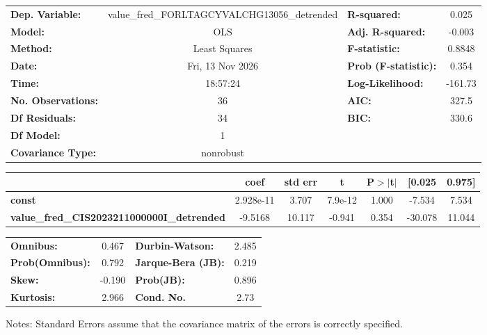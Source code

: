\begin{center}
\begin{tabular}{lclc}
\toprule
\textbf{Dep. Variable:}                            & value\_fred\_FORLTAGCYVALCHG13056\_detrended & \textbf{  R-squared:         } &     0.025   \\
\textbf{Model:}                                    &                     OLS                      & \textbf{  Adj. R-squared:    } &    -0.003   \\
\textbf{Method:}                                   &                Least Squares                 & \textbf{  F-statistic:       } &    0.8848   \\
\textbf{Date:}                                     &               Fri, 13 Nov 2026               & \textbf{  Prob (F-statistic):} &    0.354    \\
\textbf{Time:}                                     &                   18:57:24                   & \textbf{  Log-Likelihood:    } &   -161.73   \\
\textbf{No. Observations:}                         &                        36                    & \textbf{  AIC:               } &     327.5   \\
\textbf{Df Residuals:}                             &                        34                    & \textbf{  BIC:               } &     330.6   \\
\textbf{Df Model:}                                 &                         1                    & \textbf{                     } &             \\
\textbf{Covariance Type:}                          &                  nonrobust                   & \textbf{                     } &             \\
\bottomrule
\end{tabular}
\begin{tabular}{lcccccc}
                                                   & \textbf{coef} & \textbf{std err} & \textbf{t} & \textbf{P$> |$t$|$} & \textbf{[0.025} & \textbf{0.975]}  \\
\midrule
\textbf{const}                                     &    2.928e-11  &        3.707     &   7.9e-12  &         1.000        &       -7.534    &        7.534     \\
\textbf{value\_fred\_CIS2023211000000I\_detrended} &      -9.5168  &       10.117     &    -0.941  &         0.354        &      -30.078    &       11.044     \\
\bottomrule
\end{tabular}
\begin{tabular}{lclc}
\textbf{Omnibus:}       &  0.467 & \textbf{  Durbin-Watson:     } &    2.485  \\
\textbf{Prob(Omnibus):} &  0.792 & \textbf{  Jarque-Bera (JB):  } &    0.219  \\
\textbf{Skew:}          & -0.190 & \textbf{  Prob(JB):          } &    0.896  \\
\textbf{Kurtosis:}      &  2.966 & \textbf{  Cond. No.          } &     2.73  \\
\bottomrule
\end{tabular}
\end{center}

Notes: \newline
 [1] Standard Errors assume that the covariance matrix of the errors is correctly specified.